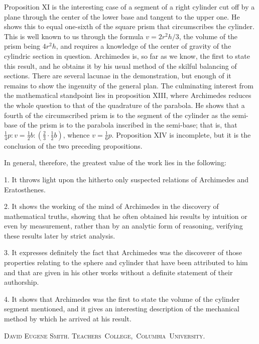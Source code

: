 \documentclass[12pt]{article}
\begin{document}
Proposition XI is the interesting case of a segment of a right
cylinder cut off by a plane through the center of the lower base and
tangent to the upper one. He shows this to equal one-sixth of the
square prism that circumscribes the cylinder. This is well known to us
through the formula $v = 2r^2h/3$, the volume of the prism being
$4r^2h$, and requires a knowledge of the center of gravity of the
cylindric section in question.  Archimedes is, so far as we know, the
first to state this result, and he obtains it by his usual method of
the skilful balancing of sections.  There are several lacunae in the
demonstration, but enough of it remains to show the ingenuity of the
general plan. The culminating interest from the mathematical
standpoint lies in proposition XIII, where Archimedes reduces the
whole question to that of the quadrature of the parabola. He shows
that a fourth of the circumscribed prism is to the segment of the
cylinder as the semi-base of the prism is to the parabola inscribed in
the semi-base; that is, that $\frac{1}{4}p : v = \frac{1}{2}b :
(\frac{2}{3} \cdot \frac{1}{2}b)$, whence $v = \frac{1}{6}p$.
Proposition XIV is incomplete, but it is the conclusion of the two
preceding propositions.

In general, therefore, the greatest value of the work lies in the
following:

1. It throws light upon the hitherto only suspected relations of
Archi\-medes and Eratosthenes.

2. It shows the working of the mind of Archimedes in the discovery of
mathematical truths, showing that he often obtained his results by
intuition or even by measurement, rather than by an analytic form of
reasoning, verifying these results later by strict analysis.

3. It expresses definitely the fact that Archimedes was the discoverer
of those properties relating to the sphere and cylinder that have been
attributed to him and that are given in his other works without a
definite statement of their authorship.

4. It shows that Archimedes was the first to state the volume of the
cylinder segment mentioned, and it gives an interesting description of
the mechanical method by which he arrived at his result.

{\hspace*{\fill}\textsc{David Eugene Smith.}}\linebreak
{\hspace*{\fill}\textsc{Teachers~College,~Columbia~University.}}\linebreak
\end{document}
